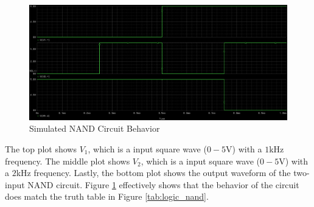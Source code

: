 \begin{figure}[h!]
	\centering
	\includegraphics[scale=0.3]{./images/nand_transient_output.PNG}
	\caption{Simulated NAND Circuit Behavior}
	\label{fig:nand_sim}
\end{figure}

\FloatBarrier

The top plot shows $V_1$, which is a input square wave ($0 - 5$\si{\volt}) with a $1$\si{\kilo\hertz} frequency.
The middle plot shows $V_2$, which is a input square wave ($0 - 5$\si{\volt}) with a $2$\si{\kilo\hertz} frequency.
Lastly, the bottom plot shows the output waveform of the two-input NAND circuit.
Figure \ref{fig:nand_sim} effectively shows that the behavior of the circuit does match the truth table in Figure \ref{tab:logic_nand}.
